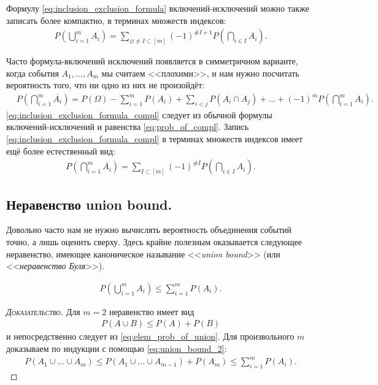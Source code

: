 \documentclass[../main.tex]{subfiles}
\begin{document}
Формулу \eqref{eq:inclusion_exclusion_formula} включений-исключений можно также записать более компактно, в терминах множеств индексов:
\begin{align*}
 P \left( \bigcup_{i=1}^{m} A_i \right) = \sum_{\varnothing \neq I \subset [m]} (-1)^{\# I + 1} P \left( \bigcap_{i \in I} A_i \right).
\end{align*}

Часто формула-включений исключений появляется в симметричном варианте, когда события $ A_1, \ldots, A_m $ мы считаем <<плохими>>, и нам нужно посчитать вероятность того, что ни одно из них не произойдёт:
\begin{align}
 \label{eq:inclusion_exclusion_formula_compl}
 &P \left( \bigcap_{i=1}^{m} \overline{A_i} \right) = P(\Omega) - \sum_{i=1}^{m}P(A_i) + \sum_{i < j} P(A_i \cap A_j) + \ldots + (-1)^{m} P \left( \bigcap_{i=1}^{m}A_i \right).
\end{align} \eqref{eq:inclusion_exclusion_formula_compl} следует из обычной формулы включений-исключений и равенства \eqref{eq:prob_of_compl}. Запись \eqref{eq:inclusion_exclusion_formula_compl} в терминах множеств индексов имеет ещё более естественный вид:
\begin{align*}
 P \left( \bigcap_{i=1}^{m}\overline{A_i} \right)=\sum_{I \subset [m]} (-1)^{\# I} P \left( \bigcap_{i \in I}A_i \right).
\end{align*}

\subsection{Неравенство union bound.}

Довольно часто нам не нужно вычислять вероятность объединения событий точно, а лишь оценить сверху. Здесь крайне полезным оказывается следующее неравенство, имеющее каноническое называние <<\textit{union bound}>> (или <<\textit{неравенство Буля}>>).

\begin{prop}
 \begin{align}
  \label{eq:union_bound}
  P \left( \bigcup_{i=1}^{m}A_i \right) \leqslant \sum_{i=1}^{m} P(A_i).
 \end{align}
\end{prop}
\begin{proof}[\normalfont\textsc{Доказательство}]
 Для $ m=2 $ неравенство имеет вид
 \begin{align}
  \label{eq:union_bound_2}
  P(A \cup B) \leqslant P(A) + P(B)
 \end{align} и непосредственно следует из \eqref{eq:elem_prob_of_union}. Для произвольного $ m $ доказываем по индукции с помощью \eqref{eq:union_bound_2}:
 \begin{align*}
  P(A_1 \cup \ldots \cup A_m) \leqslant P(A_1 \cup \ldots \cup A_{m-1}) + P(A_m) \leqslant \sum_{i=1}^{m} P(A_i).
 \end{align*}
\end{proof}
\end{document}
